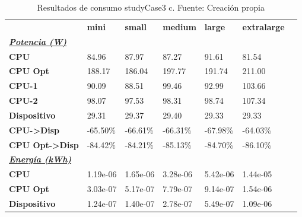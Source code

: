\begin{table}[H]
    \centering
    \begin{tabular}{lllllll}
    \rowcolor[HTML]{DAE8FC} \ & \textbf{mini} & \textbf{small} & \textbf{medium} & \textbf{	large} & \textbf{	extralarge} \\
    \cellcolor[HTML]{DAE8FC} \textbf{\textbf{{\emph{{\underline{{Potencia (W)}}}}}}} &  &  &  & 	 & 	 \\
    \rowcolor[HTML]{EFEFEF} \cellcolor[HTML]{DAE8FC} \textbf{CPU} & 84.96 & 87.97 & 87.27 & 	91.61 & 	81.54 \\
    \cellcolor[HTML]{DAE8FC} \textbf{CPU Opt} & 188.17 & 186.04 & 197.77 & 	191.74 & 	211.00 \\
    \rowcolor[HTML]{EFEFEF} \cellcolor[HTML]{DAE8FC} \textbf{\quad CPU-1} & 90.09 & 88.51 & 99.46 & 	92.99 & 	103.66 \\
    \cellcolor[HTML]{DAE8FC} \textbf{\quad CPU-2} & 98.07 & 97.53 & 98.31 & 	98.74 & 	107.34 \\
    \rowcolor[HTML]{EFEFEF} \cellcolor[HTML]{DAE8FC} \textbf{Dispositivo} & 29.31 & 29.37 & 29.40 & 	29.33 & 	29.33 \\
    \cellcolor[HTML]{DAE8FC} \textbf{CPU->Disp} & -65.50\% & -66.61\% & -66.31\% & 	-67.98\% & 	-64.03\% \\
    \rowcolor[HTML]{EFEFEF} \cellcolor[HTML]{DAE8FC} \textbf{CPU Opt->Disp} & -84.42\% & -84.21\% & -85.13\% & 	-84.70\% & 	-86.10\% \\
    \cellcolor[HTML]{DAE8FC} \textbf{\textbf{{\emph{{\underline{{Energía (kWh)}}}}}}} &  &  &  & 	 & 	 \\
    \rowcolor[HTML]{EFEFEF} \cellcolor[HTML]{DAE8FC} \textbf{CPU} & 1.19e-06 & 1.65e-06 & 3.28e-06 & 	5.42e-06 & 	1.44e-05 \\
    \cellcolor[HTML]{DAE8FC} \textbf{CPU Opt} & 3.03e-07 & 5.17e-07 & 7.79e-07 & 	9.14e-07 & 	1.54e-06 \\
    \rowcolor[HTML]{EFEFEF} \cellcolor[HTML]{DAE8FC} \textbf{Dispositivo} & 1.24e-07 & 1.40e-07 & 2.78e-07 & 	5.49e-07 & 	1.09e-06 \\
    \end{tabular}
    \caption[Resultados de consumo studyCase3 c]{{Resultados de consumo studyCase3 c. Fuente: Creación propia}}
    \label{table_test_studyCase3_c_hw_powerResults}
\end{table}
